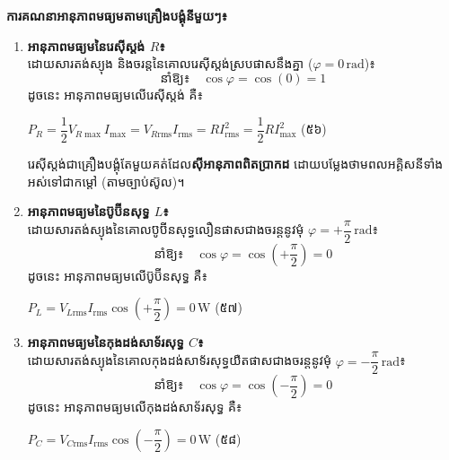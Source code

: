\vspace{0.6em}
\noindent
\textbf{ការគណនាអានុភាពមធ្យមតាមគ្រឿងបង្គុំនីមួយៗ៖}

\begin{enumerate}[label=\textbf{\arabic*.} ,itemsep=5pt, topsep=2pt, leftmargin=1.6em]
	\item \textbf{អានុភាពមធ្យមនៃរេស៊ីស្តង់ $R$៖}\\
	ដោយសារតង់ស្យុង និងចរន្តនៃគោលរេស៊ីស្តង់ស្របផាសនឹងគ្នា ($\varphi = 0\,\mathrm{rad}$)៖
	\[ \text{នាំឱ្យ៖} \quad \cos\varphi = \cos(0) = 1 \]
	ដូចនេះ អានុភាពមធ្យមលើរេស៊ីស្តង់ គឺ៖
	\begin{center}
		$\boxed{P_R = \dfrac{1}{2} V_{R\max} I_{\max} = V_{R\mathrm{rms}} I_{\mathrm{rms}} = R I_{\mathrm{rms}}^2 = \dfrac{1}{2} R I_{\max}^2}$ \quad (៥៦)
	\end{center}
	រេស៊ីស្តង់ជាគ្រឿងបង្គុំតែមួយគត់ដែល\textbf{ស៊ីអានុភាពពិតប្រាកដ} ដោយបម្លែងថាមពលអគ្គិសនីទាំងអស់ទៅជាកម្ដៅ (តាមច្បាប់ស៊ូល)។

	\item \textbf{អានុភាពមធ្យមនៃប៊ូប៊ីនសុទ្ធ $L$៖}\\
	ដោយសារតង់ស្យុងនៃគោលប៊ូប៊ីនសុទ្ធលឿនផាសជាងចរន្តនូវមុំ $\varphi = +\dfrac{\pi}{2}\,\mathrm{rad}$៖
	\[ \text{នាំឱ្យ៖} \quad \cos\varphi = \cos\left(+\dfrac{\pi}{2}\right) = 0 \]
	ដូចនេះ អានុភាពមធ្យមលើប៊ូប៊ីនសុទ្ធ គឺ៖
	\begin{center}
		$\boxed{P_L = V_{L\mathrm{rms}} I_{\mathrm{rms}} \cos\left(+\dfrac{\pi}{2}\right) = 0\,\text{W}}$ \quad (៥៧)
	\end{center}

	\item \textbf{អានុភាពមធ្យមនៃកុងដង់សាទ័រសុទ្ធ $C$៖}\\
	ដោយសារតង់ស្យុងនៃគោលកុងដង់សាទ័រសុទ្ធយឺតផាសជាងចរន្តនូវមុំ $\varphi = -\dfrac{\pi}{2}\,\mathrm{rad}$៖
	\[ \text{នាំឱ្យ៖} \quad \cos\varphi = \cos\left(-\dfrac{\pi}{2}\right) = 0 \]
	ដូចនេះ អានុភាពមធ្យមលើកុងដង់សាទ័រសុទ្ធ គឺ៖
	\begin{center}
		$\boxed{P_C = V_{C\mathrm{rms}} I_{\mathrm{rms}} \cos\left(-\dfrac{\pi}{2}\right) = 0\,\text{W}}$ \quad (៥៨)
	\end{center}
\end{enumerate}

